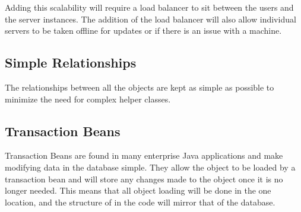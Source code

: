 \par
Adding this scalability will require a load balancer to sit between the users and the server instances. The addition of the load balancer will also allow individual servers to be taken offline for updates or if there is an issue with a machine.

\subsection{Simple Relationships}
\par
The relationships between all the objects are kept as simple as possible to minimize the need for complex helper classes.

\subsection{Transaction Beans}
\par
Transaction Beans are found in many enterprise Java applications and make modifying data in the database simple. They allow the object to be loaded by a transaction bean and will store any changes made to the object once it is no longer needed. This means that all object loading will be done in the one location, and the structure of in the code will mirror that of the database.


